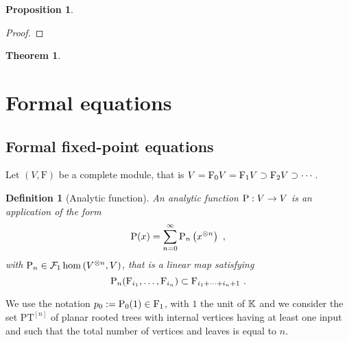 \documentclass[twoside, 10pt]{amsart}
\newtheorem{theorem}[lemma]{Theorem}
\newtheorem{definition}[lemma]{Definition}
\newtheorem{proposition}[lemma]{Proposition}
\begin{document}
\begin{proposition}
\end{proposition}

\begin{proof}
\end{proof}

\begin{theorem}


\end{theorem}



\appendix

\section{Formal equations\bruno{[Bruno]}}

\subsection{Formal fixed-point equations}\label{Sec:FixedPtEq}

Let $(V, \mathrm{F})$ be a  complete  module, that is $V=\mathrm{F}_0 V=\mathrm{F}_1 V\supset \mathrm{F}_2 V\supset \cdots$. 

\begin{definition}[Analytic function]
An \emph{analytic function} $\mathrm{P} : V \to V$ is an application of the form 
\[\mathrm{P}(x)=\sum_{n=0}^{\infty}\mathrm{P}_n\left(x^{\otimes n}\right)\ ,\] 
with $\mathrm{P}_n \in \mathcal{F}_1 \hom\left(V^{\otimes n}, V\right)$, that is a linear map satisfying
\[
\mathrm{P}_n(\mathrm{F}_{i_1}, \ldots,\mathrm{F}_{i_n})\subset \mathrm{F}_{i_1+\cdots+i_n+1}\ .
\]
\end{definition}

We use the notation $p_0:=\mathrm{P}_0(1)\in \mathrm{F}_1$, with $1$ the unit of $\mathbb{K}$ and we consider the set $\mathrm{PT}^{[n]}$ of planar rooted trees with internal vertices having at least one input  and such that the total number of vertices and leaves is equal to $n$. 
\end{document}
